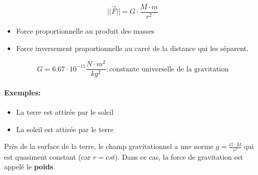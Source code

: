 \documentclass[
    11pt,
    a4paper,
    oneside,
    headinlcude, footinclude,
    twoside,
]{report}
\renewcommand{\vec}[1]{\overrightarrow{#1}}
\begin{document}
\begin{enumerate}
\begin{center}
\begin{minipage}{.49\linewidth}
                \begin{equation}
                    \label{eq:3.2}
                    || \vec F || = G \cdot \frac{M \cdot m}{r^{2}} 
                \end{equation}

                \begin{itemize}
                    \item Force proportionnelle au produit des masses
                    \item Force inversement proportionnelle au carré de la
                        distance qui les séparent.
                \end{itemize}
            \end{minipage}
        \end{center}

        $$G = 6.67 \cdot 10^{-11} \frac{N \cdot m^{2}}{kg^{2}}: \text{
        constante universelle de la gravitation}$$

        \paragraph{Exemples:}

        \begin{itemize}
            \item La terre est attirée par le soleil
            \item La soleil est attirée par le terre 
        \end{itemize}

        Près de la surface de la terre, le champ gravitationnel a une norme $g =
        \frac{G \cdot M}{r^{2}}$  qui est quasiment constant (car $r = cst$). Dans ce
        cas, la force de gravitation est appelé le \textbf{poids}.



\end{enumerate}
\end{document}
